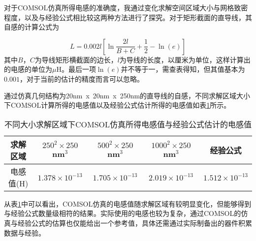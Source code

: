             
            对于COMSOL仿真所得电感的准确度，我通过变化求解空间区域大小与网格致密程度，以及与经验公式相比较这两种方法进行了探究。对于矩形截面的直导线，其自感的计算公式为\cite{grover2004inductance}

            \begin{equation}
                \label{eqn:SelfInductance}
                L = 0.002l \left [ \ln \frac{2l}{B+C} + \frac{1}{2} - \ln(e) \right ]
            \end{equation}
            其中$B$，$C$为导线矩形横截面的边长，$l$为导线的长度，以厘米为单位，这样计算出的电感的单位为$ \mu  $H。最后一项$\ln(e)$并不等于一，需查表得知，但其值基本为$0.001$，对于当前的估计的精度而言可以忽略。
            

            通过仿真几何结构为20nm~x~20nm~x~250nm的直导线的自感，不同求解区域大小下COMSOL计算所得的电感值以及经验公式估计所得的电感值如表\ref{tab:InductanceComparison}所示。


\begin{table}[htb]
  \centering
  \caption{不同大小求解区域下COMSOL仿真所得电感值与经验公式估计的电感值}
  \label{tab:InductanceComparison}
    \begin{tabular}{c|cccc} %
      \toprule %
      求解区域 & $250^2\times 250$nm$^3$ & $500^2\times 250$nm$^3$ & $1000^2\times 250$nm$^3$ & 经验公式 \\
      \midrule %
      电感值(H) & $1.378\times 10^{-13} $ & $1.705\times 10^{-13} $ & $2.019\times 10^{-13} $ & $1.512\times 10^{-13} $  \\
      \bottomrule %
    \end{tabular}
\end{table}

        
        从表\ref{tab:InductanceComparison}中可以看出，COMSOL仿真的电感值随求解区域有较明显变化，但能够得到与经验公式数量级相符的结果。实际使用的电感也较为复杂，通过COMSOL的仿真与经验公式的估算也仅能给出一个参考值，具体还需通过实际制备出的器件积累数据与经验。

    